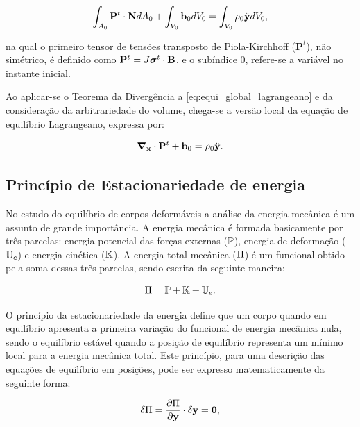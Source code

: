 \begin{align}
	\int_{A_0} \mathbf{P}^t \cdot \mathbf{N} dA_0 + \int_{V_0} \mathbf{b}_0 dV_0 = \int_{V_0} \rho_0  \ddot{\mathbf{y}} dV_0, \label{eq:equi_global_lagrangeano}
\end{align}

\noindent na qual o primeiro tensor de tensões transposto de Piola-Kirchhoff ($\mathbf{P}^t$), não simétrico, é definido como $\mathbf{P}^t = J \boldsymbol{\sigma}^t \cdot \mathbf{B}$, e o subíndice $0$, refere-se a variável no instante inicial.

Ao aplicar-se o Teorema da Divergência a \autoref{eq:equi_global_lagrangeano} e da consideração da arbitrariedade do volume, chega-se a versão local da equação de equilíbrio Lagrangeano, expressa por:

\begin{align}
	\boldsymbol{\nabla}_{\mathbf{x}} \cdot \mathbf{P}^t +  \mathbf{b}_0 = \rho_0  \ddot{\mathbf{y}}. \label{eq:equi_local_lagrangeano}
\end{align}


\subsection{Princípio de Estacionariedade de energia}

No estudo do equilíbrio de corpos deformáveis a análise da energia mecânica é um assunto de grande importância. A energia mecânica é formada basicamente por três parcelas: energia potencial das forças externas ($\mathbb{P}$), energia de deformação ($\mathbb{U}_e$) e energia cinética ($\mathbb{K}$). A energia total mecânica ($\Pi$) é um funcional obtido pela soma dessas três parcelas, sendo escrita da seguinte maneira:

\begin{align}
	\Pi = \mathbb{P} + \mathbb{K} + \mathbb{U}_e.
\end{align}

O princípio da estacionariedade da energia define que um corpo quando em equilíbrio apresenta a primeira variação do funcional de energia mecânica nula, sendo o equilíbrio estável quando a posição de equilíbrio representa um mínimo local para a energia mecânica total. Este princípio, para uma descrição das equações de equilíbrio em posições, pode ser expresso matematicamente da seguinte forma:

\begin{align}
	\delta\Pi = \frac{\partial{\Pi}}{\partial{\mathbf{y}}} \cdot \delta\mathbf{y} = \mathbf{0}, \label{eq:princ_esta}
\end{align}

